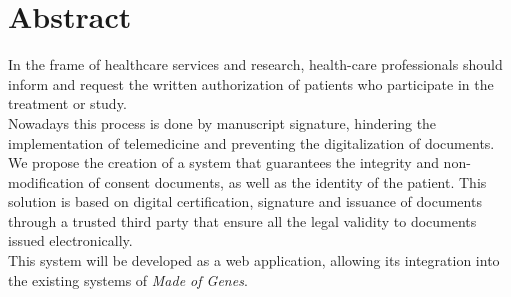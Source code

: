 \chapter*{Abstract}
In the frame of healthcare services and research, health-care professionals should inform and request the written authorization of patients who participate in the treatment or study.\\
\newline Nowadays this process is done by manuscript signature, hindering the implementation of telemedicine and preventing the digitalization of documents. \\
\newline We propose the creation of a system that guarantees the integrity and non-modification of consent documents, as well as the identity of the patient. This solution is based on digital certification, signature and issuance of documents through a trusted third party that ensure all the legal validity to documents issued electronically.\\
\newline This system will be developed as a web application, allowing its integration into the existing systems of \textit{Made of Genes}.
